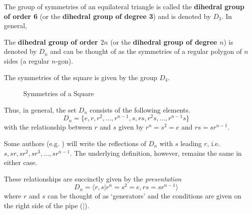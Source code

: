 The group of symmetries of an equilateral triangle is called the \textbf{dihedral group of order 6} (or the \textbf{dihedral group of degree 3}) and is denoted by $D_3$. In general,
\begin{definition}
    The \textbf{dihedral group of order $2n$} (or the \textbf{dihedral group of degree $n$}) is denoted by $D_n$ and can be thought of as the symmetries of a regular polygon of $n$ sides (a regular $n$-gon).
\end{definition}

\newpage

\begin{example}
    The symmetries of the square is given by the group $D_4$.
\end{example} 
\begin{figure}[h]
    \centering
    \caption{Symmetries of a Square}
\end{figure}

Thus, in general, the set $D_n$ consists of the following elements.
\[
    D_n = \{e, r, r^2, \dots, r^{n-1}, s, rs, r^2s, \dots, r^{n-1}s\}
\]
with the relationship between $r$ and $s$ given by $r^n = s^2 = e$ and $rs = sr^{n-1}$.

\begin{remark}
    Some authors (e.g. \cite{humphreys_1996}) will write the reflections of $D_n$ with $s$ leading $r$, i.e. $s, sr, sr^2, sr^3, \dots, sr^{n-1}$. The underlying definition, however, remains the same in either case.
\end{remark}

These relationships are succinctly given by the \textit{presentation}
\[
    D_n = \langle r, s \vert r^n = s^2 = e, rs = sr^{n-1} \rangle
\]
where $r$ and $s$ can be thought of as `generators' and the conditions are given on the right side of the pipe ($|$).

\newpage

